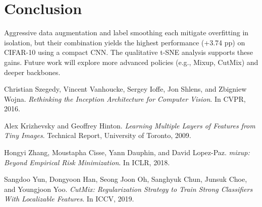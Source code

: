 \documentclass[11pt]{article}
\begin{document}
\section{Conclusion}
Aggressive data augmentation and label smoothing each mitigate overfitting in isolation, but their combination yields the highest performance (+3.74 pp) on CIFAR-10 using a compact CNN. The qualitative t-SNE analysis supports these gains. Future work will explore more advanced policies (e.g., Mixup, CutMix) and deeper backbones.

\begin{thebibliography}{9}
 Christian Szegedy, Vincent Vanhoucke, Sergey Ioffe, Jon Shlens, and Zbigniew Wojna. \textit{Rethinking the Inception Architecture for Computer Vision}. In CVPR, 2016.

 Alex Krizhevsky and Geoffrey Hinton. \textit{Learning Multiple Layers of Features from Tiny Images}. Technical Report, University of Toronto, 2009.

 Hongyi Zhang, Moustapha Cisse, Yann Dauphin, and David Lopez-Paz. \textit{mixup: Beyond Empirical Risk Minimization}. In ICLR, 2018.

 Sangdoo Yun, Dongyoon Han, Seong Joon Oh, Sanghyuk Chun, Junsuk Choe, and Youngjoon Yoo. \textit{CutMix: Regularization Strategy to Train Strong Classifiers With Localizable Features}. In ICCV, 2019.
\end{thebibliography}
\end{document}
